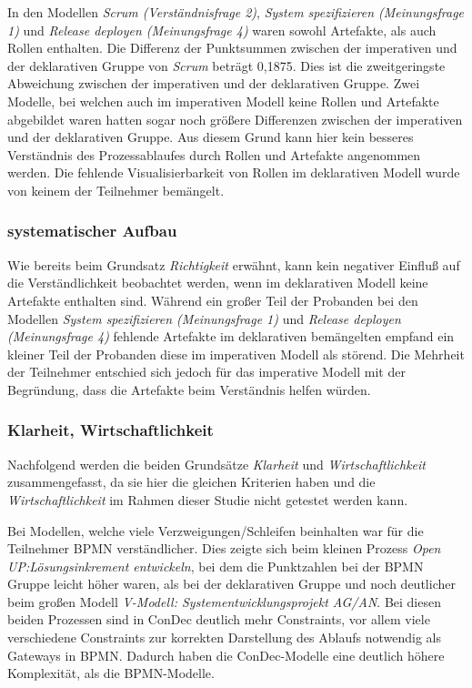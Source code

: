 In den Modellen \textit{Scrum (Verständnisfrage 2)}, \textit{System spezifizieren (Meinungsfrage 1)} und \textit{Release deployen (Meinungsfrage 4)} waren sowohl Artefakte, als auch Rollen enthalten. Die Differenz der Punktsummen zwischen der imperativen und der deklarativen Gruppe von \textit{Scrum} beträgt 0,1875. Dies ist die zweitgeringste Abweichung zwischen der imperativen und der deklarativen Gruppe. Zwei Modelle, bei welchen auch im imperativen Modell keine Rollen und Artefakte abgebildet waren hatten sogar noch größere Differenzen zwischen der imperativen und der deklarativen Gruppe. Aus diesem Grund kann hier kein besseres Verständnis des Prozessablaufes durch Rollen und Artefakte angenommen werden. \newline
Die fehlende Visualisierbarkeit von Rollen im deklarativen Modell wurde von keinem der Teilnehmer bemängelt.\newline



\subsubsection{systematischer Aufbau}

Wie bereits beim Grundsatz \textit{Richtigkeit} erwähnt, kann kein negativer Einfluß auf die Verständlichkeit beobachtet werden, wenn im deklarativen Modell keine Artefakte enthalten sind.\newline
Während ein großer Teil der Probanden bei den Modellen \textit{System spezifizieren (Meinungsfrage 1)} und \textit{Release deployen (Meinungsfrage 4)} fehlende Artefakte im deklarativen bemängelten empfand ein kleiner Teil der Probanden diese im imperativen Modell als störend. Die Mehrheit der Teilnehmer entschied sich jedoch für das imperative Modell mit der Begründung, dass die Artefakte beim Verständnis helfen würden. 

\subsubsection{Klarheit, Wirtschaftlichkeit}



Nachfolgend werden die beiden Grundsätze \textit{Klarheit} und \textit{Wirtschaftlichkeit} zusammengefasst, da sie hier die gleichen Kriterien haben und die \textit{Wirtschaftlichkeit} im Rahmen dieser Studie nicht getestet werden kann.\newline

Bei Modellen, welche viele Verzweigungen/Schleifen beinhalten war für die Teilnehmer BPMN verständlicher. Dies zeigte sich beim kleinen Prozess \textit{Open UP:Lösungsinkrement entwickeln}, bei dem die Punktzahlen bei der BPMN Gruppe leicht höher waren, als bei der deklarativen Gruppe und noch deutlicher beim großen Modell \textit{V-Modell: Systementwicklungsprojekt AG/AN}. Bei diesen beiden Prozessen sind in ConDec deutlich mehr Constraints, vor allem viele verschiedene Constraints zur korrekten Darstellung des Ablaufs notwendig als Gateways in BPMN. Dadurch haben die ConDec-Modelle eine deutlich höhere Komplexität, als die BPMN-Modelle.\newline

